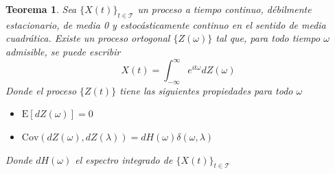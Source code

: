\documentclass[12pt,letterpaper,draft]{book}
\newtheorem{teorema}{Teorema}[chapter]
\newcommand{\intR}{\int_{-\infty}^{\infty}}
\newcommand{\E}[1]{\mathrm{E}\left[ #1 \right]}
\newcommand{\Cov}[1]{\mathrm{Cov}\left( #1 \right)}
\newcommand{\abso}[1]{\left| #1 \right|}
\newcommand{\xt}{$\{X(t)\}_{t\in \mathcal{T}}$ }
\newcommand{\entero}[1]{\left\lfloor #1 \right\rfloor}
\begin{document}
\begin{teorema}
Sea \xt un proceso a tiempo continuo, débilmente estacionario, de media 0 y estocásticamente continuo en el sentido de media cuadrática. Existe un proceso ortogonal $\{Z(\omega)\}$ tal que, para todo tiempo $\omega$ admisible, se puede escribir
\begin{equation*}
X(t) = \intR e^{i t \omega} dZ(\omega)
\end{equation*}
Donde el proceso $\{Z(t)\}$ tiene las siguientes propiedades para todo $\omega$
\begin{itemize}
\item $\E{dZ(\omega)} = 0$
\item $\Cov{dZ(\omega),dZ(\lambda)} = dH(\omega) \delta(\omega, \lambda)$
\end{itemize}
Donde $dH(\omega)$ el espectro integrado de \xt
\label{rep_espectral}
\end{teorema}

\end{document}
